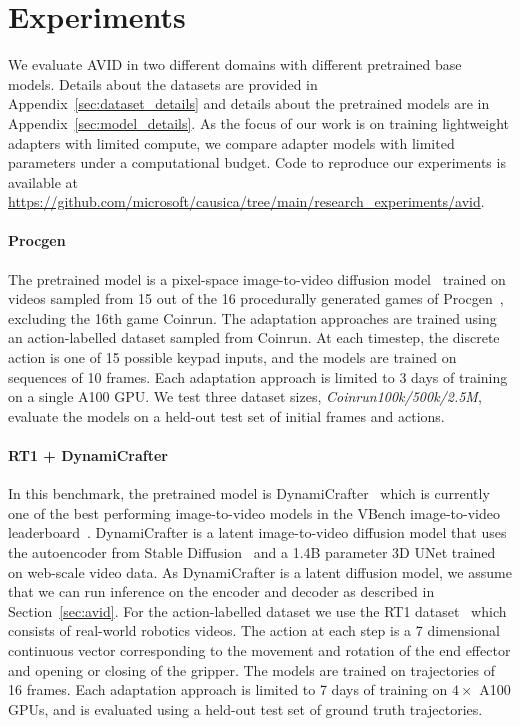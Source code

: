 \vspace{-1mm}
\section{Experiments}
We evaluate AVID in two different domains with different pretrained base models. Details about the datasets are provided in Appendix~\ref{sec:dataset_details} and details about the pretrained models are in Appendix~\ref{sec:model_details}. As the focus of our work is on training lightweight adapters with limited compute, we compare adapter models with limited parameters under a computational budget.
%
Code to reproduce our experiments is available at \url{https://github.com/microsoft/causica/tree/main/research_experiments/avid}.

\vspace{-2mm}
\paragraph{Procgen} The pretrained model is a pixel-space image-to-video diffusion model~\citep{ho2022video} trained on videos sampled from 15 out of the 16 procedurally generated games of Procgen~\citep{cobbe2020leveraging}, excluding the 16th game Coinrun.
%
The adaptation approaches are trained using an action-labelled dataset sampled from Coinrun.
%
At each timestep, the discrete action is one of 15 possible keypad inputs, and the models are trained on sequences of 10 frames.
%
Each adaptation approach is limited to 3 days of training on a single A100 GPU.
%
We test three dataset sizes, \textit{Coinrun100k/500k/2.5M}, evaluate the models on a held-out test set of initial frames and actions.

\vspace{-2mm}
\paragraph{RT1 + DynamiCrafter} In this benchmark, the pretrained model is DynamiCrafter~\citep{xing2023dynamicrafter} which is currently one of the best performing  image-to-video models in the VBench image-to-video leaderboard~\citep{huang2024vbench}. DynamiCrafter is a latent image-to-video diffusion model that uses the autoencoder from Stable Diffusion~\citep{rombach2022high} and a 1.4B parameter 3D UNet trained on web-scale video data. As DynamiCrafter is a latent diffusion model, we assume that we can run inference on the encoder and decoder as described in Section~\ref{sec:avid}.
%
For the action-labelled dataset we use the RT1 dataset~\citep{brohan2022rt} which consists of real-world robotics videos. The action at each step is a 7 dimensional continuous vector corresponding to the movement and rotation of the end effector and opening or closing of the gripper. The models are trained on trajectories of 16 frames. Each adaptation approach is limited to 7 days of training on $4\times$ A100 GPUs, and is evaluated using a held-out test set of ground truth trajectories.

